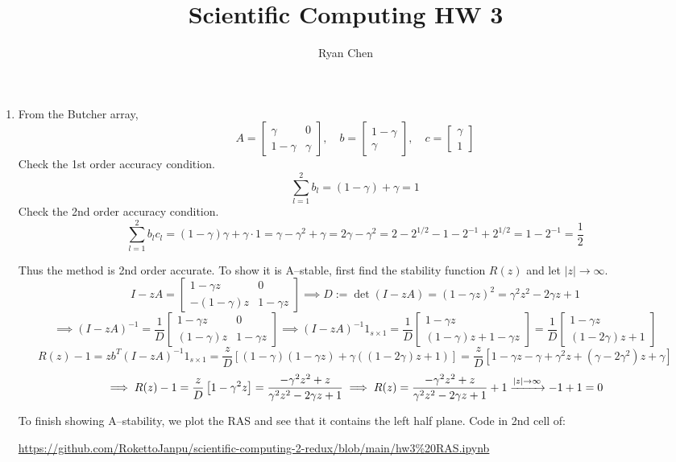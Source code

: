 \documentclass{article}
\title{Scientific Computing HW 3}
\author{Ryan Chen}
\newcommand{\sbr}[1]{\left[#1\right]}
\newcommand{\m}[2][b]{\begin{#1matrix}#2\end{#1matrix}}
\newcommand{\inv}{^{-1}}
\newcommand{\imp}{\implies}
\begin{document}
\maketitle



\begin{enumerate}
	
	
	
\item From the Butcher array,
$$A = \m{\gamma & 0 \\ 1-\gamma & \gamma},
\quad b = \m{1-\gamma \\ \gamma},
\quad c = \m{\gamma \\ 1}$$
Check the 1st order accuracy condition.
$$\sum_{l=1}^2 b_l = (1-\gamma)+\gamma = 1$$
Check the 2nd order accuracy condition.
$$\sum_{l=1}^2 b_lc_l = (1-\gamma)\gamma+\gamma\cdot 1
= \gamma-\gamma^2+\gamma
= 2\gamma-\gamma^2
= 2-2^{1/2}-1-2\inv+2^{1/2}
= 1-2\inv
= \frac12$$

Thus the method is 2nd order accurate. To show it is A--stable, first find the stability function $R(z)$ and let $|z|\to\infty$. 
$$I - zA = \m{1-\gamma z & 0 \\ -(1-\gamma)z & 1-\gamma z}
\imp D := \det(I-zA) = (1-\gamma z)^2 = \gamma^2z^2 - 2\gamma z+1$$
$$\imp (I-zA)\inv = \frac1D\m{1-\gamma z & 0 \\ (1-\gamma)z & 1-\gamma z}
\imp (I-zA)\inv 1_{s\times 1} = \frac1D\m{1-\gamma z \\ (1-\gamma)z+1-\gamma z} = \frac1D\m{1-\gamma z \\ (1-2\gamma)z+1}$$
$$R(z) - 1 = zb^T(I-zA)\inv 1_{s\times 1} = \frac zD\sbr{(1-\gamma)(1-\gamma z)+\gamma((1-2\gamma)z+1)}
= \frac zD\sbr{1-\gamma z-\gamma+\gamma^2z+(\gamma-2\gamma^2)z+\gamma}$$
$$\imp R(z) - 1 = \frac zD\sbr{1-\gamma^2z}
= \frac{-\gamma^2z^2+z}{\gamma^2z^2-2\gamma z+1}
\imp R(z) = \frac{-\gamma^2z^2+z}{\gamma^2z^2-2\gamma z+1} + 1 \app[|z|] -1+1 = 0$$

To finish showing A--stability, we plot the RAS and see that it contains the left half plane. Code in 2nd cell of:  

\url{https://github.com/RokettoJanpu/scientific-computing-2-redux/blob/main/hw3%20RAS.ipynb}


\end{enumerate}
\end{document}
